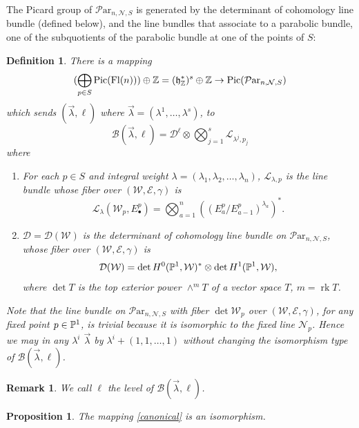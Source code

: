 \documentclass[11pt]{amsart}
\newcommand\bull{{\bullet}}
\newcommand\frh{\mathfrak{h}}
\newcommand\Pic{\operatorname{Pic}}
\newcommand\me{\mathcal{E}}
\newcommand\Fl{\operatorname{Fl}}
\newcommand\ml{\mathcal{L}}
\newcommand\mw{\mathcal{W}}
\newcommand\rk{\operatorname{rk}}
\newcommand\mn{\mathcal{N}}
\newcommand\Par{\mathcal{P}\text{ar} }
\newtheorem{remark}[theorem]{ Remark}
\newtheorem{proposition}[theorem]{Proposition}
\newtheorem{defi}[theorem]{Definition}
\numberwithin{theorem}{subsection}
\begin{document}
The Picard group of $\Par_{n,\mn,S}$ is generated by the determinant of cohomology line bundle (defined below), and the line bundles that associate to a parabolic bundle, one of the subquotients of the parabolic bundle at one of the points of $S$:
\begin{defi}\label{levell}
There is a mapping
\begin{equation}\label{canonical}
(\bigoplus_{p\in S} \Pic(\Fl(n)))\oplus \Bbb{Z}=(\frh_{\Bbb{Z}}^*)^s\oplus\Bbb{Z}\to \Pic (\Par_{n,\mn,S})
\end{equation}
which sends $(\vec{\lambda},\ell)$ where  $\vec{\lambda}=(\lambda^1,\dots,\lambda^s)$, to
\begin{equation}\label{bruckner}
\mathcal{B}(\vec{\lambda},\ell)=\mathcal{D}^{\ell}\otimes \bigotimes_{j=1}^s\ml_{\lambda^j,p_j}
\end{equation}
where
\begin{enumerate}
\item[(i)] For each $p\in S$ and integral weight $\lambda=(\lambda_1,\lambda_2,\dots, \lambda_n)$, $\ml_{\lambda,p}$ is the line bundle whose fiber over
 $(\mw,\me,\gamma)$ is
  $$\ml_{\lambda}(\mw_p,E^p_{\bull})=\bigotimes_{a=1}^{n} ((E^p_a/E^p_{a-1})^{\lambda_a})^*.$$
\item [(ii)] $\mathcal{D}=\mathcal{D}(\mw)$ is the determinant of cohomology line bundle on $\Par_{n,\mn,S}$, whose fiber over $(\mw,\me,\gamma)$  is
$$\mathcal{D}(\mw)=\det H^0(\Bbb{P}^1,\mw)^*\otimes \det H^1(\Bbb{P}^1,\mw),$$
 where $\det T$  is the top exterior power $\wedge^m T$ of a vector space $T$, $m=\rk T$.
 \end{enumerate}

 Note that the line bundle on $\Par_{n,\mn,S}$ with fiber $\det \mw_p$ over $(\mw,\me,\gamma)$, for any fixed point $p\in\Bbb{P}^1$, is trivial because it is isomorphic to the fixed line $\mn_p$. Hence we may in  any $\lambda^i$ $\vec{\lambda}$ by $\lambda^i+(1,1,\dots,1)$ without changing the isomorphism type of
     $\mathcal{B}(\vec{\lambda},\ell)$.
\end{defi}

\begin{remark}\label{defL}
We call $\ell$ the level of $\mathcal{B}(\vec{\lambda},\ell)$.
\end{remark}

\begin{proposition}\label{LaSo}
The mapping \eqref{canonical} is an isomorphism.
\end{proposition}
\end{document}
